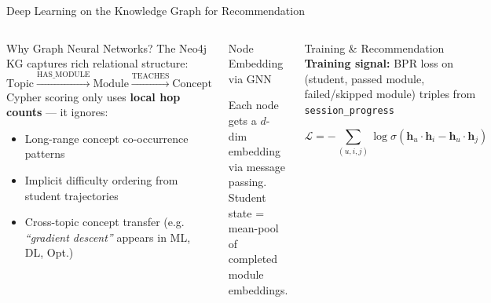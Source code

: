 \documentclass[aspectratio=169,9pt]{beamer}
\begin{document}
\begin{frame}{Deep Learning on the Knowledge Graph for Recommendation}
\begin{columns}[T]
  \begin{block}{Why Graph Neural Networks?}
    The Neo4j KG captures rich relational structure:
    \[
      \text{Topic} \xrightarrow{\text{HAS\_MODULE}} \text{Module}
      \xrightarrow{\text{TEACHES}} \text{Concept}
    \]
    Cypher scoring only uses \textbf{local hop counts} — it ignores:
    \begin{itemize}
      \item Long-range concept co-occurrence patterns
      \item Implicit difficulty ordering from student trajectories
      \item Cross-topic concept transfer (e.g. \textit{``gradient descent''} appears in ML, DL, Opt.)
    \end{itemize}
  \end{block}

  \begin{block}{Node Embedding via GNN}

    \medskip
    \small
    Each node gets a $d$-dim embedding via message passing.\\
    Student state = mean-pool of completed module embeddings.
  \end{block}

  \begin{block}{Training \& Recommendation}
    \small
    \textbf{Training signal:} BPR loss on (student, passed module, failed/skipped module) triples from \texttt{session\_progress}

    \[
      \mathcal{L} = -\sum_{(u,i,j)} \log \sigma\!\left(
        \mathbf{h}_u \cdot \mathbf{h}_i - \mathbf{h}_u \cdot \mathbf{h}_j
      \right)
    \]


\end{block}
\end{columns}
\end{frame}
\end{document}
